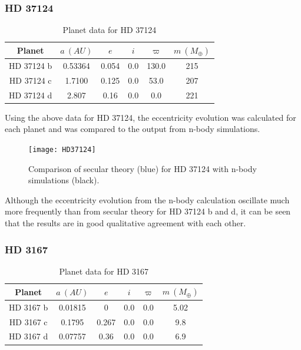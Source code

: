 \documentclass[11pt, oneside]{article}   	%
\begin{document}
\subsubsection{HD 37124}

\begin{table}[!h]
\centering
\small
\label{my-label}
\begin{tabular}{|c|c|c|c|c|c|}
\hline
\rowcolor[HTML]{C0C0C0} 
Planet & $a \ (AU)$       & $e$     & $i$   & $\varpi$  & $m \ (M _{\oplus})$ \\ \hline
HD 37124 b    & 0.53364 & 0.054 & 0.0 & 130.0 & 215  \\ \hline
HD 37124 c    & 1.7100  & 0.125 & 0.0 & 53.0 & 207  \\ \hline
HD 37124 d    & 2.807   & 0.16  & 0.0 & 0.0 & 221 \\ \hline
\end{tabular}
\caption{Planet data for HD 37124}
\end{table}

Using the above data for HD 37124, the eccentricity evolution was calculated for each planet and was compared to the output from n-body simulations.

\begin{figure}[!h]
\begin{center}
\texttt{[image: HD37124]}
\caption[]{Comparison of secular theory (blue) for HD 37124 with n-body simulations (black).}
\label{}
\end{center}
\end{figure}

Although the eccentricity evolution from the n-body calculation oscillate much more frequently than from secular theory for HD 37124 b and d, it can be seen that the results are in good qualitative agreement with each other.

\newpage

\subsubsection{HD 3167}

\begin{table}[!h]
\centering
\small
\label{my-label}
\begin{tabular}{|c|c|c|c|c|c|}
\hline
\rowcolor[HTML]{C0C0C0} 
Planet & $a \ (AU)$       & $e$     & $i$   & $\varpi$  & $m \ (M _{\oplus})$ \\ \hline
HD 3167 b    & 0.01815 & 0     & 0.0 & 0.0 & 5.02 \\ \hline
HD 3167 c    & 0.1795  & 0.267 & 0.0 & 0.0 & 9.8  \\ \hline
HD 3167 d    & 0.07757 & 0.36  & 0.0 & 0.0 & 6.9  \\ \hline
\end{tabular}
\caption{Planet data for HD 3167}
\end{table}
\end{document}
